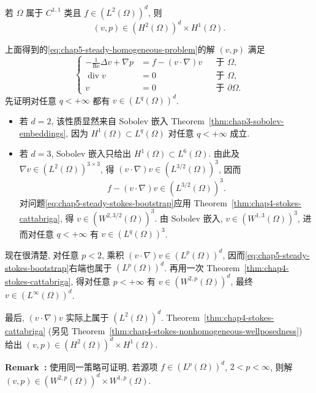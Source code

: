 \begin{Theorem}
\label{thm:chap5-steady-homogeneous-regularity}
若 $\Omega$ 属于 $C^{1,1}$ 类且 $f\in(L^2(\Omega))^d$, 则
\[
 (v,p)\in(H^2(\Omega))^d\times H^1(\Omega).
\]
\end{Theorem}

\begin{Proof}
上面得到的\eqref{eq:chap5-steady-homogeneous-problem}的解 $(v,p)$ 满足
\begin{equation}
\left\{
\begin{aligned}
 -\frac1{\operatorname{Re}}\Delta v+\nabla p&=f-(v\cdot\nabla)v&&\text{于 }\Omega,\\
 \operatorname{div}v&=0&&\text{于 }\Omega,\\
 v&=0&&\text{于 }\partial\Omega.
\end{aligned}
\right.
\label{eq:chap5-steady-stokes-bootstrap}
\end{equation}
先证明对任意 $q<+\infty$ 都有 $v\in(L^q(\Omega))^d$.
\begin{itemize}
 \item 若 $d=2$, 该性质显然来自 Sobolev 嵌入 Theorem~\ref{thm:chap3-sobolev-embeddings}, 因为 $H^1(\Omega)\subset L^q(\Omega)$ 对任意 $q<+\infty$ 成立.
 \item 若 $d=3$, Sobolev 嵌入只给出 $H^1(\Omega)\subset L^6(\Omega)$. 由此及 $\nabla v\in(L^2(\Omega))^{3\times3}$, 得 $(v\cdot\nabla)v\in(L^{3/2}(\Omega))^3$, 因而
 \[
 f-(v\cdot\nabla)v\in(L^{3/2}(\Omega))^3.
 \]
 对问题\eqref{eq:chap5-steady-stokes-bootstrap}应用 Theorem~\ref{thm:chap4-stokes-cattabriga}, 得 $v\in(W^{2,3/2}(\Omega))^3$. 由 Sobolev 嵌入, $v\in(W^{1,3}(\Omega))^3$, 进而对任意 $q<+\infty$ 有 $v\in(L^q(\Omega))^3$.
\end{itemize}
现在很清楚, 对任意 $p<2$, 乘积 $(v\cdot\nabla)v\in(L^p(\Omega))^d$, 因而\eqref{eq:chap5-steady-stokes-bootstrap}右端也属于 $(L^p(\Omega))^d$. 再用一次 Theorem~\ref{thm:chap4-stokes-cattabriga}, 得对任意 $p<+\infty$ 有 $v\in(W^{2,p}(\Omega))^d$, 最终 $v\in(L^\infty(\Omega))^d$.

最后, $(v\cdot\nabla)v$ 实际上属于 $(L^2(\Omega))^d$. Theorem~\ref{thm:chap4-stokes-cattabriga} (另见 Theorem~\ref{thm:chap4-stokes-nonhomogeneous-wellposedness}) 给出 $(v,p)\in(H^2(\Omega))^d\times H^1(\Omega)$.
\end{Proof}

\par\noindent{}\textbf{Remark~\thechapterfivesectionthreeremark:}\label{rem:chap5-steady-lp-regularity}
使用同一策略可证明, 若源项 $f\in(L^p(\Omega))^d$, $2<p<\infty$, 则解 $(v,p)\in(W^{2,p}(\Omega))^d\times W^{1,p}(\Omega)$.

